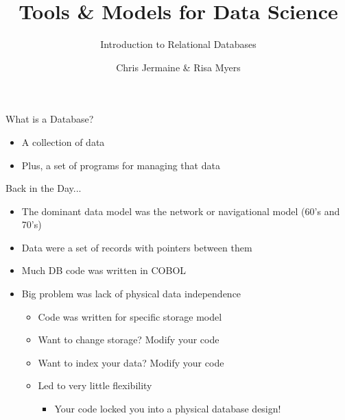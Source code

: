 \documentclass[aspectratio=169]{beamer}
\title[]
{Tools \& Models for Data Science}
\subtitle{Introduction to Relational Databases}
\author[]{Chris Jermaine \& Risa Myers}
\institute
{
  Rice University
}
\date[]{}
\begin{document}
\begin{frame}
 \titlepage
\end{frame}


\begin{frame}{What is a Database?}

\begin{itemize}
\item A collection of data
\item Plus, a set of programs for managing that data
\end{itemize}
\end{frame}

\begin{frame}{Back in the Day...}

\begin{itemize}
\item The dominant data model was the network or navigational model (60's and 70's)
\item Data were a set of records with pointers between them
\item Much DB code was written in COBOL
\item Big problem was lack of physical data independence
	\begin{itemize}
	\item Code was written for specific storage model
	\item Want to change storage?  Modify your code
	\item Want to index your data?  Modify your code
	\item Led to very little flexibility
		\begin{itemize}
		\item Your code locked you into a physical database design!
		\end{itemize}
	\end{itemize}
\end{itemize}
\end{frame}
\end{document}
